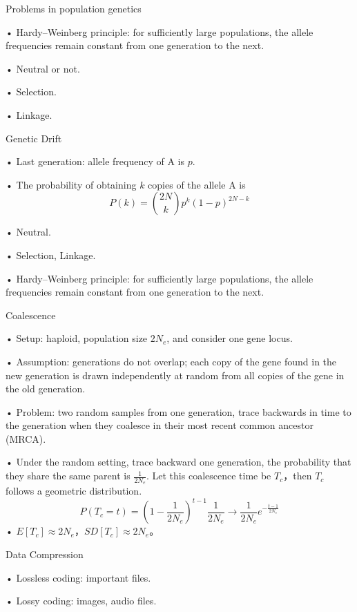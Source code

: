 \documentclass[UTF8]{report}
\theoremstyle{MyLineTheoremStyle} %
\theoremstyle{MyBlockTheoremStyle} %
\theoremstyle{MySubsubsectionStyle} %
\begin{document}
\vspace{1cm}

Problems in population genetics\par
• Hardy–Weinberg principle: for sufficiently large populations, the allele frequencies remain constant from one generation to the next.\par
• Neutral or not.\par
• Selection.\par
• Linkage.\par

\vspace{1cm}

Genetic Drift\par
• Last generation: allele frequency of A is $p$.\par
• The probability of obtaining $k$ copies of the allele A is
\[
P(k) = \binom{2N}{k} p^k (1 - p)^{2N - k}
\]\par
• Neutral.\par
• Selection, Linkage.\par
• Hardy–Weinberg principle: for sufficiently large populations, the allele frequencies remain constant from one generation to the next.\par

\vspace{1cm}

Coalescence\par
• Setup: haploid, population size $2N_e$, and consider one gene locus.\par
• Assumption: generations do not overlap; each copy of the gene found in the new generation is drawn independently at random from all copies of the gene in the old generation.\par
• Problem: two random samples from one generation, trace backwards in time to the generation when they coalesce in their most recent common ancestor (MRCA).\par
• Under the random setting, trace backward one generation, the probability that they share the same parent is $\frac{1}{2N_e}$. Let this coalescence time be $T_c$，then $T_c$ follows a geometric distribution.
\[
P(T_c = t) = \left(1 - \frac{1}{2N_e}\right)^{t-1} \frac{1}{2N_e} \to \frac{1}{2N_e} e^{-\frac{t-1}{2N_e}}
\]
• $E[T_c] \approx 2N_e$，$SD[T_c] \approx 2N_e$。

\vspace{1cm}

Data Compression\par
• Lossless coding: important files.\par
• Lossy coding: images, audio files.\par
\end{document}
